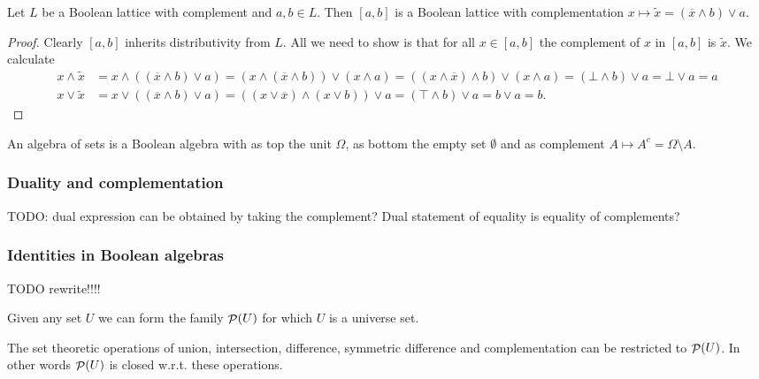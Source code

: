 \begin{proposition}
Let $L$ be a Boolean lattice with complement and $a,b\in L$. Then $[a,b]$ is a Boolean lattice with complementation $x\mapsto \widetilde{x} = (\overline{x} \wedge b)\vee a$. 
\end{proposition}
\begin{proof}
Clearly $[a,b]$ inherits distributivity from $L$. All we need to show is that for all $x\in [a,b]$ the complement of $x$ in $[a,b]$ is $\widetilde{x}$. We calculate
\begin{align*}
x \wedge \widetilde{x} &= x\wedge ((\overline{x} \wedge b)\vee a) = (x\wedge(\overline{x} \wedge b))\vee (x\wedge a) = (( x\wedge \overline{x}) \wedge b)\vee (x\wedge a) = (\bot \wedge b)\vee a = \bot \vee a = a \\
x \vee \widetilde{x} &= x\vee ((\overline{x} \wedge b)\vee a) = ((x\vee \overline{x}) \wedge (x\vee b))\vee a = (\top \wedge b) \vee a = b\vee a = b.
\end{align*}
\end{proof}

\begin{proposition}
An algebra of sets is a Boolean algebra with as top the unit $\Omega$, as bottom the empty set $\emptyset$ and as complement $A\mapsto A^c = \Omega\setminus A$.
\end{proposition}

\subsubsection{Duality and complementation}
TODO: dual expression can be obtained by taking the complement? Dual statement of equality is equality of complements?

\subsubsection{Identities in Boolean algebras}
TODO rewrite!!!!

Given any set $U$ we can form the family $\mathop{\mathcal{P}}(U)$ for which $U$ is a universe set.

The set theoretic operations of union, intersection, difference, symmetric difference and complementation can be restricted to $\mathop{\mathcal{P}}(U)$. In other words $\mathop{\mathcal{P}}(U)$ is closed w.r.t. these operations.

